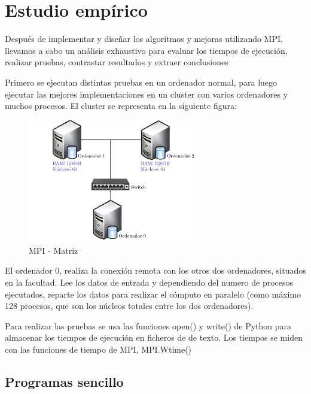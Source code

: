 


\chapter{Estudio empírico}
\label{cap:c4_estudio}	
Después de implementar y diseñar los algoritmos y mejoras utilizando MPI, llevamos a cabo un análisis exhaustivo para evaluar los tiempos de ejecución, realizar pruebas, contrastar resultados y extraer conclusiones

Primero se ejecutan distintas pruebas en un ordenador normal, para luego ejecutar las mejores implementaciones en un cluster con varios ordenadores y muchos procesos. El cluster se representa en la siguiente figura:


\begin{figure}[!h]
	\centering
	\includegraphics[width=0.65\textwidth]{images/chapter_4/cluster}
	\caption{MPI - Matriz}
	\label{fig:cluster}
\end{figure}


\newpage

El ordenador 0, realiza la conexión remota con los otros dos ordenadores, situados en la facultad. Lee los datos de entrada y dependiendo del numero de procesos ejecutados, reparte los datos para realizar el cómputo en paralelo (como máximo 128 procesos, que son los núcleos totales entre los dos ordenadores). 

Para realizar las pruebas se usa las funciones open() y write() de Python para almacenar los tiempos de ejecución en ficheros de de texto. Los tiempos se miden con las funciones de
tiempo de MPI, MPI.Wtime()

\section{Programas sencillo}


